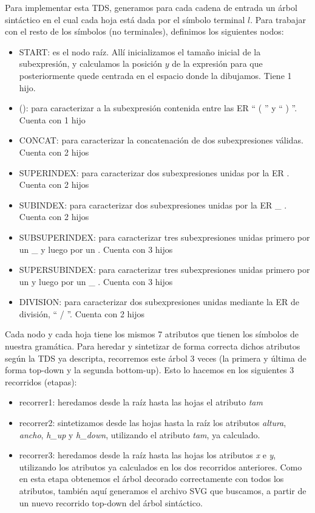 \documentclass[a4paper, 10pt, twoside]{article}
\begin{document}
Para implementar esta TDS, generamos para cada cadena de entrada un árbol sintáctico en el cual cada hoja está dada por el símbolo terminal $l$. Para trabajar con el resto de los símbolos (no terminales), definimos los siguientes nodos:
\begin{itemize}
  \item START: es el nodo raíz. Allí inicializamos el tamaño inicial de la subexpresión, y calculamos la posición $y$ de la expresión para que posteriormente quede centrada en el espacio donde la dibujamos. Tiene 1 hijo.
  \item (): para caracterizar a la subexpresión contenida entre las ER `` ( '' y `` ) ''. Cuenta con 1 hijo
  \item CONCAT: para caracterizar la concatenación de dos subexpresiones válidas. Cuenta con 2 hijos
  \item SUPERINDEX: para caracterizar dos subexpresiones unidas por la ER \detokenize{^}. Cuenta con 2 hijos
  \item SUBINDEX: para caracterizar dos subexpresiones unidas por la ER \_ . Cuenta con 2 hijos
  \item SUBSUPERINDEX: para caracterizar tres subexpresiones unidas primero por un \_ y luego por un \detokenize{^}. Cuenta con 3 hijos
  \item SUPERSUBINDEX: para caracterizar tres subexpresiones unidas primero por un \detokenize{^} y luego por un \_ . Cuenta con 3 hijos
  \item DIVISION: para caracterizar dos subexpresiones unidas mediante la ER de división, `` / ''. Cuenta con 2 hijos
\end{itemize}

Cada nodo y cada hoja tiene los mismos 7 atributos que tienen los símbolos de nuestra gramática. Para heredar y sintetizar de forma correcta dichos atributos según la TDS ya descripta, recorremos este árbol 3 veces (la primera y última de forma top-down y la segunda bottom-up). Esto lo hacemos en los siguientes 3 recorridos (etapas):
\begin{itemize}
  \item recorrer1: heredamos desde la raíz hasta las hojas el atributo \emph{tam}
  \item recorrer2: sintetizamos desde las hojas hasta la raíz los atributos \emph{altura}, \emph{ancho}, \emph{h\_up} y \emph{h\_down}, utilizando el atributo \emph{tam}, ya calculado.
  \item recorrer3: heredamos desde la raíz hasta las hojas los atributos \emph{x} e \emph{y}, utilizando los atributos ya calculados en los dos recorridos anteriores. Como en esta etapa obtenemos el árbol decorado correctamente con todos los atributos, también aquí generamos el archivo SVG que buscamos, a partir de un nuevo recorrido top-down del árbol sintáctico.
\end{itemize}
\end{document}
